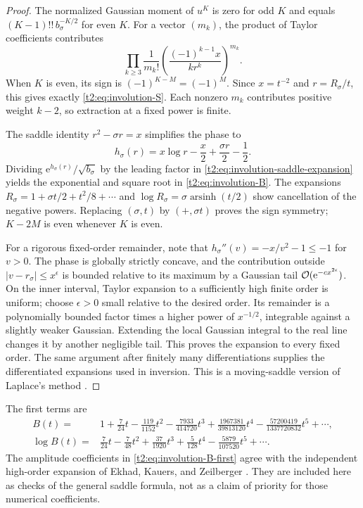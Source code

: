 \documentclass[11pt,openany]{book}
\numberwithin{equation}{chapter}
\theoremstyle{plain}
\theoremstyle{definition}
\theoremstyle{remark}
\newcommand{\ee}{\mathrm e}
\begin{document}
\begin{proof}
The normalized Gaussian moment of $u^K$ is zero for odd $K$ and equals $(K-1)!!\,b_\sigma^{-K/2}$ for even $K$. For a vector $(m_k)$, the product of Taylor coefficients contributes
\[
 \prod_{k\ge3}\frac1{m_k!}
       \left(\frac{(-1)^{k-1}x}{kr^k}\right)^{m_k}.
\]
When $K$ is even, its sign is $(-1)^{K-M}=(-1)^M$. Since $x=t^{-2}$ and $r=R_\sigma/t$, this gives exactly \eqref{t2:eq:involution-S}. Each nonzero $m_k$ contributes positive weight $k-2$, so extraction at a fixed power is finite.

The saddle identity $r^2-\sigma r=x$ simplifies the phase to
\[
 h_\sigma(r)=x\log r-\frac x2+\frac{\sigma r}{2}-\frac12.
\]
Dividing $\ee^{h_\sigma(r)}/\sqrt{b_\sigma}$ by the leading factor in \eqref{t2:eq:involution-saddle-expansion} yields the exponential and square root in \eqref{t2:eq:involution-B}. The expansions $R_\sigma=1+\sigma t/2+t^2/8+\cdots$ and $\log R_\sigma=\sigma\operatorname{arsinh}(t/2)$ show cancellation of the negative powers. Replacing $(\sigma,t)$ by $(+,\sigma t)$ proves the sign symmetry; $K-2M$ is even whenever $K$ is even.

For a rigorous fixed-order remainder, note that
$h_\sigma''(v)=-x/v^2-1\le-1$ for $v>0$. The phase is globally strictly concave, and the contribution outside $|v-r_\sigma|\le x^\epsilon$ is bounded relative to its maximum by a Gaussian tail $\bigO(\ee^{-c x^{2\epsilon}})$. On the inner interval, Taylor expansion to a sufficiently high finite order is uniform; choose $\epsilon>0$ small relative to the desired order. Its remainder is a polynomially bounded factor times a higher power of $x^{-1/2}$, integrable against a slightly weaker Gaussian. Extending the local Gaussian integral to the real line changes it by another negligible tail. This proves the expansion to every fixed order. The same argument after finitely many differentiations supplies the differentiated expansions used in inversion. This is a moving-saddle version of Laplace's method \cite{dlmflaplace}.
\end{proof}

The first terms are
\begin{align}
 B(t)={}&1+\frac7{24}t-\frac{119}{1152}t^2
       -\frac{7933}{414720}t^3
       +\frac{1967381}{39813120}t^4
       -\frac{57200419}{1337720832}t^5+\cdots,
 \label{t2:eq:involution-B-first}\\
 \log B(t)={}&\frac7{24}t-\frac7{48}t^2
      +\frac{37}{1920}t^3+\frac5{128}t^4
      -\frac{5879}{107520}t^5+\cdots.
 \label{t2:eq:involution-logB}
\end{align}
The amplitude coefficients in \eqref{t2:eq:involution-B-first} agree with the independent high-order expansion of Ekhad, Kauers, and Zeilberger \cite{ekz}. They are included here as checks of the general saddle formula, not as a claim of priority for those numerical coefficients.
\end{document}

